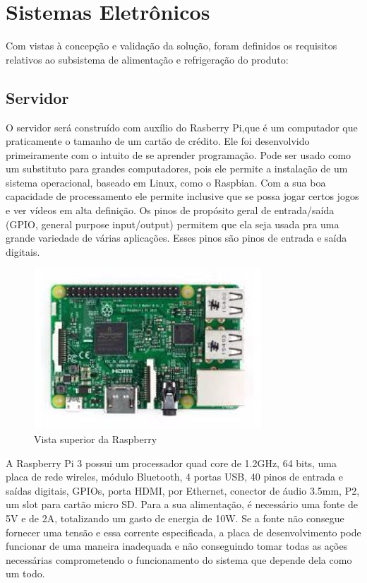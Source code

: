 \section{Sistemas Eletrônicos}
Com vistas à concepção e validação da solução, foram definidos os requisitos relativos ao subsistema de alimentação e refrigeração do produto:

\subsection{Servidor}
O servidor será construído com auxílio do Rasberry Pi,que é um computador que praticamente o tamanho de um cartão de crédito. Ele foi desenvolvido primeiramente com o intuito de se aprender programação.
Pode ser usado como um substituto para grandes computadores, pois ele permite a
instalação de um sistema operacional, baseado em Linux, como o Raspbian. Com a sua
boa capacidade de processamento ele permite inclusive que se possa jogar certos jogos e
ver vídeos em alta definição. Os pinos de propósito geral de entrada/saída (GPIO,
general purpose input/output) permitem que ela seja usada pra uma grande variedade de
várias aplicações. Esses pinos são pinos de entrada e saída digitais.
 \begin{figure}[H]
 	\begin{center}
 		\includegraphics[scale = 0.75]{figuras/Rasp.JPG}
 		\caption{Vista superior da Raspberry}
 	\end{center}
 \end{figure}
A Raspberry Pi 3 possui um processador quad core de 1.2GHz, 64 bits, uma
placa de rede wireles, módulo Bluetooth, 4 portas USB, 40 pinos de entrada e saídas digitais, GPIOs, porta HDMI, por Ethernet, conector de áudio 3.5mm, P2, um slot para cartão micro SD.
Para a sua alimentação, é necessário uma fonte de 5V e de 2A, totalizando um
gasto de energia de 10W. Se a fonte não consegue fornecer uma tensão e essa corrente especificada, a placa de desenvolvimento pode funcionar de uma maneira inadequada e não conseguindo tomar todas as ações necessárias comprometendo o funcionamento do sistema que depende dela como um todo.

